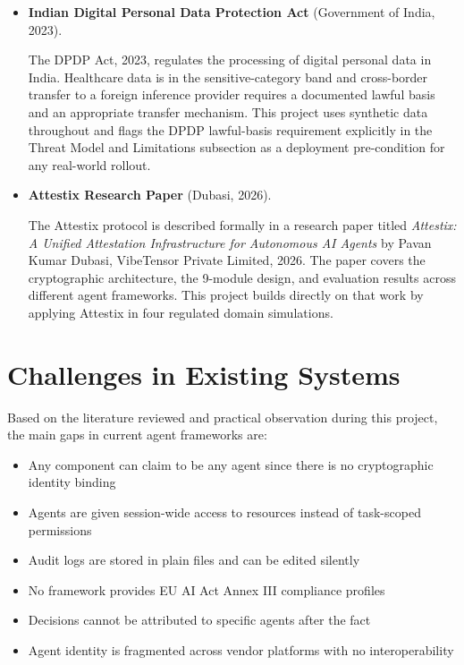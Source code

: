 \begin{itemize}
\item \textbf{Indian Digital Personal Data Protection Act} (Government of India, 2023).

The DPDP Act, 2023, regulates the processing of digital personal data in India. Healthcare data is in the sensitive-category band and cross-border transfer to a foreign inference provider requires a documented lawful basis and an appropriate transfer mechanism. This project uses synthetic data throughout and flags the DPDP lawful-basis requirement explicitly in the Threat Model and Limitations subsection as a deployment pre-condition for any real-world rollout.

\item \textbf{Attestix Research Paper} (Dubasi, 2026).

The Attestix protocol is described formally in a research paper titled \textit{Attestix: A Unified Attestation Infrastructure for Autonomous AI Agents} by Pavan Kumar Dubasi, VibeTensor Private Limited, 2026. The paper covers the cryptographic architecture, the 9-module design, and evaluation results across different agent frameworks. This project builds directly on that work by applying Attestix in four regulated domain simulations.

\end{itemize}

\newpage

\section{Challenges in Existing Systems}

Based on the literature reviewed and practical observation during this project, the main gaps in current agent frameworks are:

\begin{itemize}
    \item Any component can claim to be any agent since there is no cryptographic identity binding
    \item Agents are given session-wide access to resources instead of task-scoped permissions
    \item Audit logs are stored in plain files and can be edited silently
    \item No framework provides EU AI Act Annex III compliance profiles
    \item Decisions cannot be attributed to specific agents after the fact
    \item Agent identity is fragmented across vendor platforms with no interoperability
\end{itemize}

